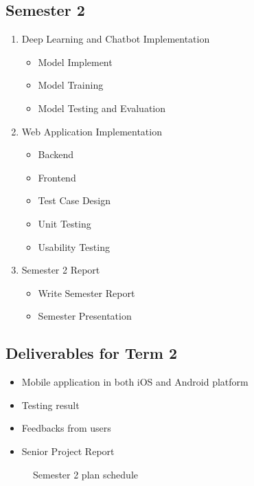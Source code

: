 \documentclass[12pt,oneside,openright,a4paper]{cpe-english-project}
\begin{document}
  \subsection{Semester 2}
    \begin{enumerate}
      \item Deep Learning and Chatbot Implementation
        \begin{itemize}
          \item Model Implement
          \item Model Training
          \item Model Testing and Evaluation
        \end{itemize}
      \item Web Application Implementation
        \begin{itemize}
          \item Backend
          \item Frontend
          \item Test Case Design
          \item Unit Testing
          \item Usability Testing
        \end{itemize}
      \item Semester 2 Report
        \begin{itemize}
          \item Write Semester Report
          \item Semester Presentation
        \end{itemize}
    \end{enumerate}

  \subsection*{Deliverables for Term 2}
    \begin{itemize}
      \item Mobile application in both iOS and Android platform
      \item Testing result
      \item Feedbacks from users
      \item Senior Project Report
    \end{itemize}
    \begin{figure}[!h]
      \centering
      \caption{Semester 2 plan schedule}\label{fig:Term2_Gantt}
    \end{figure}
\end{document}
